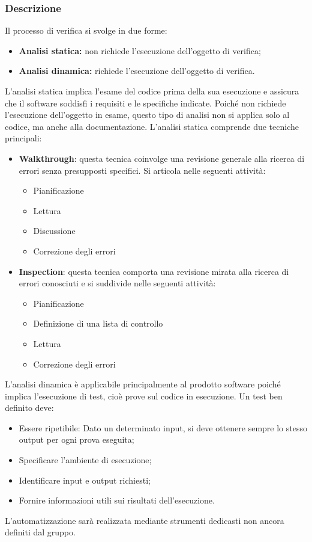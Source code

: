 \subsubsection{Descrizione}
Il processo di verifica si svolge in due forme:
\begin{itemize}
    \item \textbf{Analisi statica:} non richiede l'esecuzione dell'oggetto di verifica;
    \item \textbf{Analisi dinamica: } richiede l'esecuzione dell'oggetto di verifica.
\end{itemize}
L'analisi statica implica l'esame del codice prima della sua esecuzione e assicura che il software soddisfi i requisiti 
e le specifiche indicate. Poiché non richiede l'esecuzione dell'oggetto in esame, questo tipo di analisi 
non si applica solo al codice, ma anche alla documentazione.
L'analisi statica comprende due tecniche principali:
\begin{itemize}
    \item \textbf{Walkthrough}: questa tecnica coinvolge una revisione generale alla ricerca di errori
    senza presupposti specifici. Si articola nelle seguenti attività:
    \begin{itemize}
        \item Pianificazione
        \item Lettura
        \item Discussione
        \item Correzione degli errori
    \end{itemize}
    \item \textbf{Inspection}: questa tecnica comporta una revisione mirata alla ricerca di errori conosciuti
    e si suddivide nelle seguenti attività:
    \begin{itemize}
        \item Pianificazione
        \item Definizione di una lista di controllo
        \item Lettura
        \item Correzione degli errori
    \end{itemize}
\end{itemize}
L'analisi dinamica è applicabile principalmente al prodotto software
poiché implica l'esecuzione di test, cioè prove sul codice in esecuzione.
Un test ben definito deve:
\begin{itemize}
    \item Essere ripetibile: Dato un determinato input, si deve ottenere sempre
    lo stesso output per ogni prova eseguita;
    \item Specificare l'ambiente di esecuzione;
    \item Identificare input e output richiesti;
    \item Fornire informazioni utili sui risultati dell'esecuzione.
\end{itemize}
L'automatizzazione sarà realizzata mediante strumenti dedicasti non ancora definiti dal gruppo.
